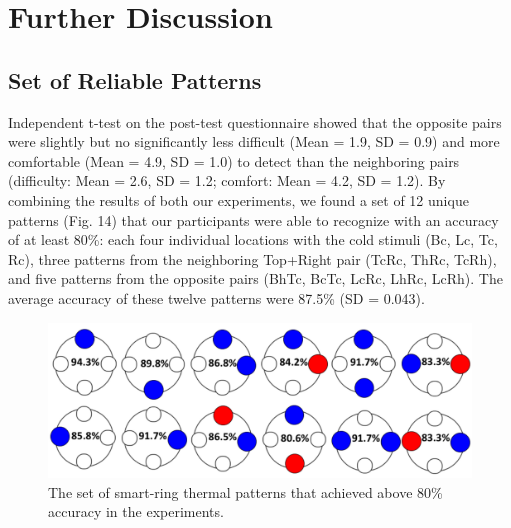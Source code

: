 \documentclass[preprint,12pt]{elsarticle}
\begin{document}
\section{Further Discussion}
\subsection{Set of Reliable Patterns}
Independent t-test on the post-test questionnaire showed that the opposite pairs were slightly but no significantly less difficult (Mean = 1.9, SD = 0.9) and more comfortable (Mean = 4.9, SD = 1.0) to detect than the neighboring pairs (difficulty: Mean = 2.6, SD = 1.2; comfort: Mean = 4.2, SD = 1.2). By combining the results of both our experiments, we found a set of 12 unique patterns (Fig. 14) that our participants were able to recognize with an accuracy of at least 80\%: each four individual locations with the cold stimuli (Bc, Lc, Tc, Rc), three patterns from the neighboring Top+Right pair (TcRc, ThRc, TcRh), and five patterns from the opposite pairs (BhTc, BcTc, LcRc, LhRc, LcRh). The average accuracy of these twelve patterns were 87.5\% (SD = 0.043).


\begin{figure}[tp]
  \centering
  \includegraphics[width=0.9\columnwidth]{img/fig14.png}
  \caption{The set of smart-ring thermal patterns that achieved above 80\% accuracy in the experiments.}
  \label{fig:14}
\end{figure}
\end{document}
